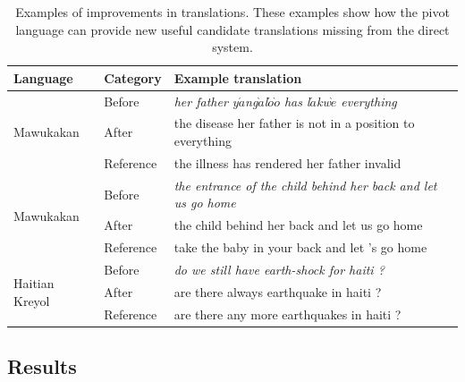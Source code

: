 \documentclass[11pt]{article}
\begin{document}
		
	\begin{table}[t]
    \centering
    {\footnotesize
	\begin{tabular}{|l|l|l|}
		\toprule
		Language & Category & Example translation \\
		\toprule
		\multirow{3}{*}{Mawukakan} & Before & \emph{her father y$\acute{a}$ng$\grave{a}$l$\acute{o}$$\grave{o}$ has l$\acute{a}$kw$\grave{e}$ everything} \\ & After & the disease her father is not in a position to everything \\ &  Reference & the illness has rendered her father invalid \\
		\midrule
		\multirow{3}{*}{Mawukakan} & Before & \emph{the entrance of the child behind her back and let us go home} \\ & After & the child behind her back and let us go home \\ & Reference & take the baby in your back and let 's go home \\ 
		\midrule
		\multirow{3}{*}{Haitian Kreyol} & Before & \emph{do we still have earth-shock for haiti ?} \\ & After & are there always earthquake in haiti ? \\ & Reference &  are there any more earthquakes in haiti ?\\
		\bottomrule
	\end{tabular}
    }
	\caption{Examples of improvements in translations. These examples show how the pivot language can provide new useful candidate translations missing from the direct system.}	
	\label{table:example_translations}
	\end{table}
\subsection{Results}
\label{sec:results}
	
\end{document}
